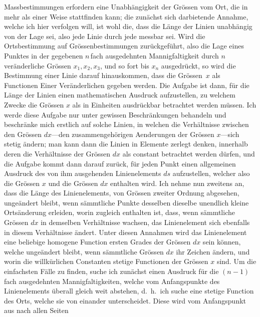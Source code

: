 \documentclass[a4paper,12pt]{article}
\begin{document}
Massbestimmungen erfordern eine Unabh\"{a}ngigkeit der
Gr\"{o}ssen vom Ort, die in mehr als einer Weise stattfinden
kann; die zun\"{a}chst sich darbietende Annahme, welche ich hier
verfolgen will, ist wohl die, dass die L\"{a}nge der Linien
unabh\"{a}ngig von der Lage sei, also jede Linie durch jede
messbar sei.  Wird die Ortsbestimmung auf Gr\"{o}ssenbestimmungen
zur\"{u}ckgef\"{u}hrt, also die Lage eines Punktes in der
gegebenen $n \,$\-fach ausgedehnten Mannigfaltigkeit durch $n$
ver\"{a}nderliche Gr\"{o}ssen $x_1, x_2, x_3$, und so fort bis
$x_n$ ausgedr\"{u}ckt, so wird die Bestimmung einer Linie darauf
hinauskommen, dass die Gr\"{o}ssen~$x$ als Functionen Einer
Ver\"{a}nderlichen gegeben werden.  Die Aufgabe ist dann, f\"{u}r
die L\"{a}nge der Linien einen mathematischen Ausdruck
aufzustellen, zu welchem Zwecke die Gr\"{o}ssen $x$ als in
Einheiten ausdr\"{u}ckbar betrachtet werden m\"{u}ssen.  Ich
werde diese Aufgabe nur unter gewissen Beschr\"{a}nkungen
behandeln und beschr\"{a}nke mich erstlich auf solche Linien, in
welchen die Verh\"{a}ltnisse zwischen den Gr\"{o}ssen $dx$---den
zusammengeh\"{o}rigen Aenderungen der Gr\"{o}ssen $x$---sich
stetig \"{a}ndern; man kann dann die Linien in Elemente zerlegt
denken, innerhalb deren die Verh\"{a}ltnisse der Gr\"{o}ssen $dx$
als constant betrachtet werden d\"{u}rfen, und die Aufgabe kommt
dann darauf zur\"{u}ck, f\"{u}r jeden Punkt einen allgemeinen
Ausdruck des von ihm ausgeh\-enden Linienelements $ds$
aufzustellen, welcher also die Gr\"{o}ssen $x$ und die
Gr\"{o}ssen $dx$ enthalten wird.  Ich nehme nun zweitens an, dass
die L\"{a}nge des Linienelements, von Gr\"{o}ssen zweiter Ordnung
abgesehen, unge\"{a}ndert bleibt, wenn s\"{a}mmtliche Punkte
desselben dieselbe unendlich kleine Orts\"{a}nderung erleiden,
worin zugleich enthalten ist, dass, wenn s\"{a}mmtliche
Gr\"{o}ssen $dx$ in demselben Verh\"{a}ltnisse wachsen, das
Linienelement sich ebenfalls in diesem Verh\"{a}ltnisse
\"{a}ndert.  Unter diesen Annahmen wird das Linienelement eine
beliebige homogene Function ersten Grades der Gr\"{o}ssen $dx$
sein k\"{o}nnen, welche unge\"{a}ndert bleibt, wenn
s\"{a}mmtliche Gr\"{o}ssen $dx$ ihr Zeichen \"{a}ndern, und worin
die willk\"{u}rlichen Constanten stetige Functionen der
Gr\"{o}ssen $x$ sind.  Um die einfachsten F\"{a}lle zu finden,
suche ich zun\"{a}chst einen Ausdruck f\"{u}r die ${(n-1)}$\-fach
ausgedehnten Mannigfaltigkeiten, welche vom Anfangspunkte des
Linienelements \"{u}berall gleich weit abstehen, d.~h.\ ich suche
eine stetige Function des Orts, welche sie von einander
unterscheidet.  Diese wird vom Anfangspunkt aus nach allen Seiten
\end{document}
